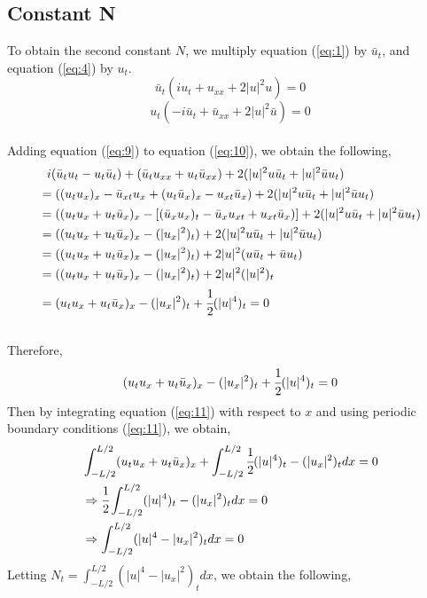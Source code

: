 \documentclass[11pt, oneside]{article}   	%
\begin{document}
\subsection{Constant N}

To obtain the second constant $N$, we multiply equation (\ref{eq:1}) by $\bar{u}_t$, and equation (\ref{eq:4}) by $u_t$.
\begin{equation} \label{eq:9}
\bar{u}_t(iu_t + u_{xx} + 2|u|^2u) = 0
\end{equation}
\begin{equation} \label{eq:10}
u_t(-i\bar{u}_t + \bar{u}_{xx} + 2|u|^2\bar{u}) = 0
\end{equation}\\
Adding equation (\ref{eq:9}) to equation (\ref{eq:10}), we obtain the following,
\begin{align*}
    &\ \ i(\bar{u}_tu_t - u_t\bar{u}_t) + (\bar{u}_tu_{xx} + u_t\bar{u}_{xx}) + 2(|u|^2u\bar{u}_t + |u|^2\bar{u}u_t)\\
    &= ((u_tu_{x})_x - \bar{u}_{xt}u_x + (u_t\bar{u}_x)_x - u_{xt}\bar{u}_x) + 2(|u|^2u\bar{u}_t + |u|^2\bar{u}u_t)\\
    &=((u_tu_{x} + u_t\bar{u}_x)_x - [(\bar{u}_{x}u_x)_t -\bar{u}_{x}u_{xt}  + u_{xt}\bar{u}_x)] + 2(|u|^2u\bar{u}_t + |u|^2\bar{u}u_t)\\
    &= ((u_tu_{x} + u_t\bar{u}_x)_x - (|u_x|^2)_t) + 2(|u|^2u\bar{u}_t + |u|^2\bar{u}u_t) \\
    &= ((u_tu_{x} + u_t\bar{u}_x)_x - (|u_x|^2)_t) + 2|u|^2(u\bar{u}_t + \bar{u}u_t) \\
    &= ((u_tu_{x} + u_t\bar{u}_x)_x - (|u_x|^2)_t) + 2|u|^2(|u|^2)_t \\
    &= (u_tu_{x} + u_t\bar{u}_x)_x - (|u_x|^2)_t + \cfrac{1}{2}(|u|^4)_t 
    = 0
\end{align*}\\
Therefore,
\begin{equation} \label{eq:11}
    (u_tu_{x} + u_t\bar{u}_x)_x - (|u_x|^2)_t + \cfrac{1}{2}(|u|^4)_t = 0
\end{equation}
Then by integrating equation (\ref{eq:11}) with respect to $x$ and using periodic boundary conditions (\ref{eq:11}), we obtain,
\begin{align*}
    &\int_{-L/2}^{L/2} (u_tu_{x} + u_t\bar{u}_x)_x + \int_{-L/2}^{L/2} \cfrac{1}{2}(|u|^4)_t - (|u_x|^2)_t dx = 0\\
    &\Rightarrow \cfrac{1}{2} \int_{-L/2}^{L/2} (|u|^4)_t - (|u_x|^2)_t dx = 0 \\
    &\Rightarrow \int_{-L/2}^{L/2} (|u|^4 - |u_x|^2)_t dx = 0
\end{align*}
Letting $N_t = \int_{-L/2}^{L/2} (|u|^4 - |u_x|^2)_tdx$, we obtain the following,
\end{document}
